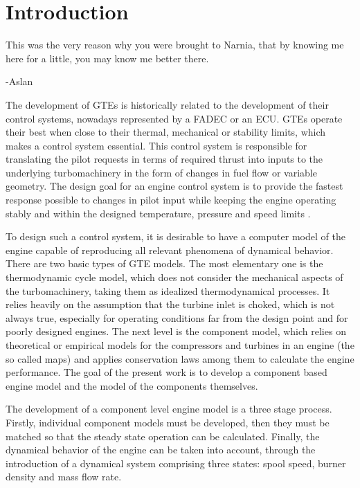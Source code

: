\documentclass[tcc]{subfiles}
\begin{document}
\chapter{Introduction}
\label{ch:intro}
\epigraph{This was the very reason why you were brought to Narnia, that by knowing me here for a little, you may know me better there.}{-Aslan}

The development of \acp{GTE} is historically related to the development of their control systems, 
nowadays represented by a \ac{FADEC} or an \ac{ECU}. \Acp{GTE} operate their best when close to their
thermal, mechanical or stability limits, which makes a control system essential.
This control system is responsible for translating the pilot requests in terms of required thrust 
into inputs to the underlying turbomachinery 
in the form of changes in fuel flow or variable geometry.
The design goal for an engine control system is to provide the fastest response possible 
to changes in pilot input
while keeping the engine operating stably and within the designed temperature, pressure and speed limits
\cite{AustinSpangIII1999}.

To design such a control system, it is desirable to have a computer model of the engine 
capable of reproducing all relevant phenomena of dynamical behavior. 
There are two basic types of \ac{GTE} models. 
The most elementary one is the thermodynamic cycle model, which does not consider the mechanical aspects of the turbomachinery, taking them as idealized thermodynamical processes. It relies heavily on the assumption that the turbine inlet is choked, which is not always true, especially for operating conditions far from the design point and for poorly designed engines.
The next level is the component model, which relies on theoretical or empirical models for the compressors and turbines in an engine (the so called maps) and applies conservation laws among them to calculate the engine performance.
The goal of the present work is to develop a component based engine model 
and the model of the components themselves. 

The development of a component level engine model is a three stage process. 
Firstly, individual component models must be developed, 
then they must be matched so that the steady state operation can be calculated.
Finally, the dynamical behavior of the engine can be taken into account, 
through the introduction of a dynamical system comprising three states: 
spool speed, burner density and mass flow rate. 
\end{document}
